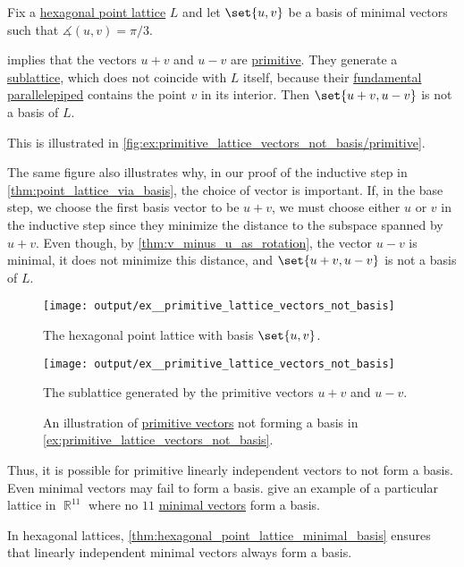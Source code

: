 \begin{example}\label{ex:primitive_lattice_vectors_not_basis}
  Fix a \hyperref[def:hexagonal_point_lattice]{hexagonal point lattice} \( L \) and let \( \set{ u, v } \) be a basis of minimal vectors such that \( \measuredangle(u, v) = \pi / 3 \).

   implies that the vectors \( u + v \) and \( u - v \) are \hyperref[def:primitive_lattice_vector]{primitive}. They generate a \hyperref[def:point_sublattice]{sublattice}, which does not coincide with \( L \) itself, because their \hyperref[def:fundamental_parallelotope]{fundamental parallelepiped} contains the point \( v \) in its interior. Then \( \set{ u + v, u - v } \) is not a basis of \( L \).

  This is illustrated in \cref{fig:ex:primitive_lattice_vectors_not_basis/primitive}.

  The same figure also illustrates why, in our proof of the inductive step in \cref{thm:point_lattice_via_basis}, the choice of vector is important. If, in the base step, we choose the first basis vector to be \( u + v \), we must choose either \( u \) or \( v \) in the inductive step since they minimize the distance to the subspace spanned by \( u + v \). Even though, by \cref{thm:v_minus_u_as_rotation}, the vector \( u - v \) is minimal, it does not minimize this distance, and \( \set{ u + v, u - v } \) is not a basis of \( L \).

  \begin{figure}[!ht]
    \begin{subcaptionblock}{0.45\textwidth}
      \centering
      \texttt{[image: output/ex\_\_primitive\_lattice\_vectors\_not\_basis]}
      \caption{The hexagonal point lattice with basis \( \set{ u, v } \).}\label{fig:ex:primitive_lattice_vectors_not_basis/basis}
    \end{subcaptionblock}
    \hfill
    \begin{subcaptionblock}{0.45\textwidth}
      \centering
      \texttt{[image: output/ex\_\_primitive\_lattice\_vectors\_not\_basis]}
      \caption{The sublattice generated by the primitive vectors \( u + v \) and \( u - v \).}\label{fig:ex:primitive_lattice_vectors_not_basis/primitive}
    \end{subcaptionblock}
    \caption{An illustration of \hyperref[def:primitive_lattice_vector]{primitive vectors} not forming a basis in \cref{ex:primitive_lattice_vectors_not_basis}.}\label{fig:ex:primitive_lattice_vectors_not_basis}
  \end{figure}

  Thus, it is possible for primitive linearly independent vectors to not form a basis. Even minimal vectors may fail to form a basis.  give an example of a particular lattice in \( \BbbR^{11} \) where no \( 11 \) \hyperref[def:minimal_lattice_vector]{minimal vectors} form a basis.

  In hexagonal lattices, \cref{thm:hexagonal_point_lattice_minimal_basis} ensures that linearly independent minimal vectors always form a basis.
\end{example}

